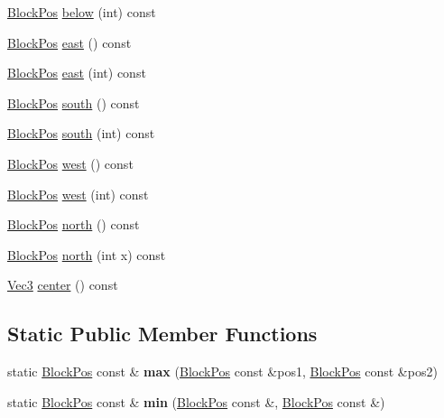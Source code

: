 \begin{DoxyCompactItemize}
\item 
\mbox{\hyperlink{struct_block_pos}{Block\+Pos}} \mbox{\hyperlink{struct_block_pos_a5776b70a3ea3ffe78ae37633d97ea602}{below}} (int) const
\item 
\mbox{\hyperlink{struct_block_pos}{Block\+Pos}} \mbox{\hyperlink{struct_block_pos_a3631ed52d6914b3ae30dfaaa22d0eca1}{east}} () const
\item 
\mbox{\hyperlink{struct_block_pos}{Block\+Pos}} \mbox{\hyperlink{struct_block_pos_ae9be8e210eee9303c27ed8a074f34da2}{east}} (int) const
\item 
\mbox{\hyperlink{struct_block_pos}{Block\+Pos}} \mbox{\hyperlink{struct_block_pos_af898a24e0c174884bf0089e451863a16}{south}} () const
\item 
\mbox{\hyperlink{struct_block_pos}{Block\+Pos}} \mbox{\hyperlink{struct_block_pos_a71d93e0bc00d67547d8df6177cc43556}{south}} (int) const
\item 
\mbox{\hyperlink{struct_block_pos}{Block\+Pos}} \mbox{\hyperlink{struct_block_pos_a315e5d7785e8f8925030bdcd5fe4a3d5}{west}} () const
\item 
\mbox{\hyperlink{struct_block_pos}{Block\+Pos}} \mbox{\hyperlink{struct_block_pos_aec17e41f3241596d751360d2b0ced8d1}{west}} (int) const
\item 
\mbox{\hyperlink{struct_block_pos}{Block\+Pos}} \mbox{\hyperlink{struct_block_pos_acb22f0caa009bb49e768f34622fe5a15}{north}} () const
\item 
\mbox{\hyperlink{struct_block_pos}{Block\+Pos}} \mbox{\hyperlink{struct_block_pos_a7a622e4dd7cd2f2c4b72d355095e4af7}{north}} (int x) const
\item 
\mbox{\hyperlink{struct_vec3}{Vec3}} \mbox{\hyperlink{struct_block_pos_ab3098efb3353c424a71040cbd4f3f91e}{center}} () const
\end{DoxyCompactItemize}
\subsection*{Static Public Member Functions}
\begin{DoxyCompactItemize}
\item 
\mbox{\label{struct_block_pos_ac96d1d6ed1518fbfded40f7a19683da7}} 
static \mbox{\hyperlink{struct_block_pos}{Block\+Pos}} const  \& {\bfseries max} (\mbox{\hyperlink{struct_block_pos}{Block\+Pos}} const \&pos1, \mbox{\hyperlink{struct_block_pos}{Block\+Pos}} const \&pos2)
\item 
\mbox{\label{struct_block_pos_a27ff9098288b2238943e968597ec72ac}} 
static \mbox{\hyperlink{struct_block_pos}{Block\+Pos}} const  \& {\bfseries min} (\mbox{\hyperlink{struct_block_pos}{Block\+Pos}} const \&, \mbox{\hyperlink{struct_block_pos}{Block\+Pos}} const \&)
\end{DoxyCompactItemize}

